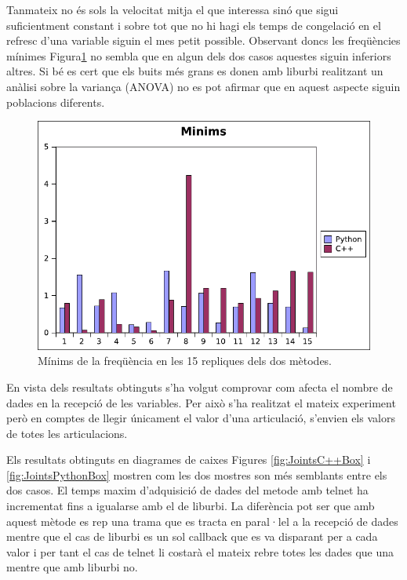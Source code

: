 \documentclass[12pt,a4paper,final,twoside]{article}
\begin{document}
Tanmateix no és sols la velocitat mitja el que interessa sinó que sigui suficientment constant i sobre tot que no hi hagi els temps de congelació en el refresc d'una variable siguin el mes petit possible.
Observant doncs les freqüències mínimes Figura\ref{fig:MinOneLeg} no sembla que en algun dels dos casos aquestes siguin inferiors altres. Si bé es cert que els buits més grans es donen amb liburbi realitzant un anàlisi sobre la variança (ANOVA) no es pot afirmar que en aquest aspecte siguin poblacions diferents. 

\begin{figure}[h!]
	\centering
    \includegraphics[scale=1]{images/MinOneLeg.pdf}
	 \caption{Mínims de la freqüència en les 15 repliques dels dos mètodes.}
  \label{fig:MinOneLeg}
\end{figure}

En vista dels resultats obtinguts s'ha volgut comprovar com afecta el nombre de dades en la recepció de les variables. Per això s'ha realitzat el mateix experiment però en comptes de llegir únicament el valor d'una articulació, s'envien els valors de totes les articulacions.

Els resultats obtinguts en diagrames de caixes Figures \ref{fig:JointsC++Box} i \ref{fig:JointsPythonBox} mostren com les dos mostres son més semblants entre els dos casos. El temps maxim d'adquisició de dades del metode amb telnet ha incrementat fins a igualarse amb el de liburbi. La diferència pot ser que amb aquest mètode es rep una trama que es tracta en paral·lel a la recepció de dades mentre que el cas de liburbi es un sol callback que es va disparant per a cada valor i per tant el cas de telnet li costarà el mateix rebre totes les dades que una mentre que amb liburbi no.
\end{document}
